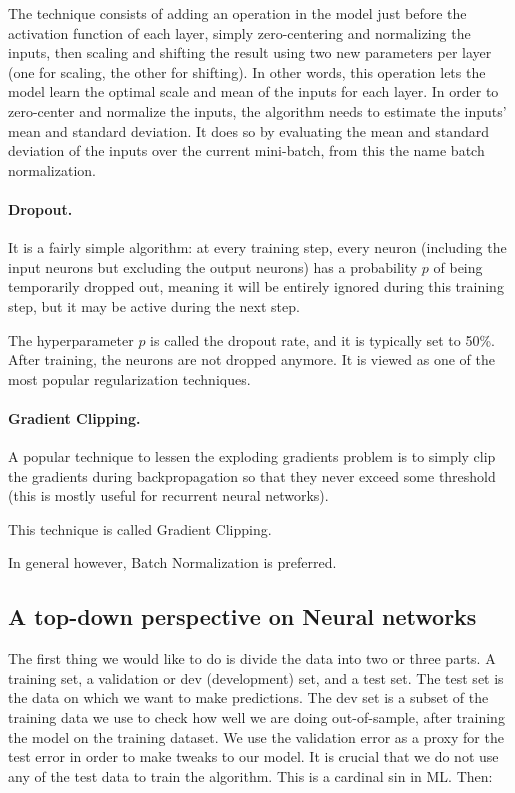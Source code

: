 The technique consists of adding an operation in the model just before the activation function of each
layer, simply zero-centering and normalizing the inputs, then scaling and shifting the result using two new
parameters per layer (one for scaling, the other for shifting). In other words, this operation lets the model
learn the optimal scale and mean of the inputs for each layer.
In order to zero-center and normalize the inputs, the algorithm needs to estimate the inputs’ mean and
standard deviation. It does so by evaluating the mean and standard deviation of the inputs over the current
mini-batch, from this the name batch normalization.

\paragraph{Dropout.}
It is a fairly simple algorithm: at every training step, every neuron (including the input neurons but
excluding the output neurons) has a probability $p$ of being temporarily dropped out, meaning it will be
entirely ignored during this training step, but it may be active during the next step.

The
hyperparameter $p$ is called the dropout rate, and it is typically set to 50\%. After training, the neurons are not dropped anymore.
 It is viewed as one of the most popular regularization techniques.

\paragraph{Gradient Clipping.}
A popular technique to lessen the exploding gradients problem is to simply clip the gradients during
backpropagation so that they never exceed some threshold (this is mostly useful for recurrent neural
networks).

This technique is called Gradient Clipping.

In general however, Batch
Normalization is preferred.

\subsection*{A top-down perspective on Neural networks}

The first thing we would like to do is divide the data into two or three
parts. A training set, a validation or dev (development) set, and a
test set. The test set is the data on which we want to make
predictions. The dev set is a subset of the training data we use to
check how well we are doing out-of-sample, after training the model on
the training dataset. We use the validation error as a proxy for the
test error in order to make tweaks to our model. It is crucial that we
do not use any of the test data to train the algorithm. This is a
cardinal sin in ML. Then:

